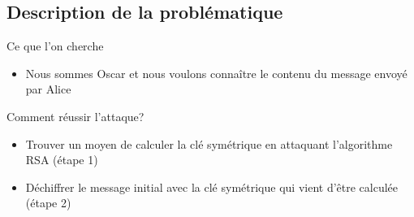 \documentclass{beamer}
\begin{document}
	\subsection{Description de la problématique}

	\begin{frame}
	\begin{block}{Ce que l'on cherche}
		\begin{itemize}
		\item Nous sommes Oscar et nous voulons connaître le contenu du message envoyé par Alice
		\end{itemize}
	\end{block}
	\begin{block}{Comment réussir l'attaque?}
		\begin{itemize}
		\item Trouver un moyen de calculer la clé symétrique en attaquant l'algorithme RSA (étape 1)
		\item Déchiffrer le message initial avec la clé symétrique qui vient d'être calculée (étape 2)
		\end{itemize}
	\end{block}
    \end{frame}
\end{document}

